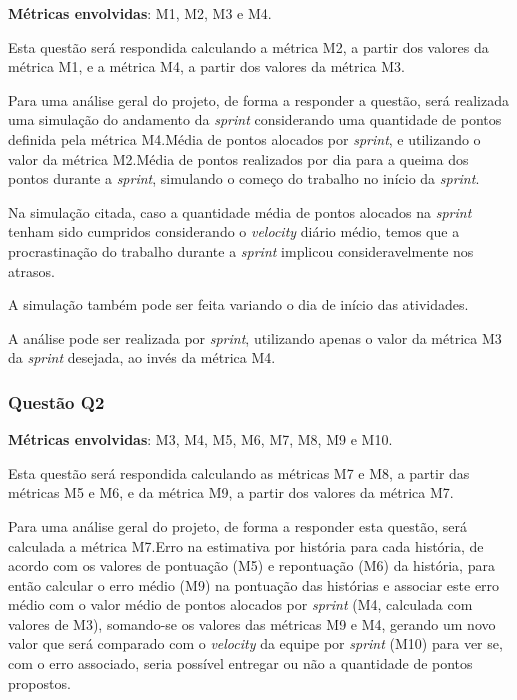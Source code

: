       		\textbf{Métricas envolvidas}: M1, M2, M3 e M4.

      		Esta questão será respondida calculando a métrica M2, a partir dos valores da métrica M1, e a métrica M4, a partir dos valores
      		da métrica M3.

      		Para uma análise geral do projeto, de forma a responder a questão, será realizada uma simulação do andamento da \textit{sprint} considerando uma quantidade de
      		pontos definida pela métrica M4.Média de pontos alocados por \textit{sprint}, e utilizando o valor da métrica M2.Média de pontos realizados por dia para a queima dos pontos durante a \textit{sprint}, simulando o começo do trabalho no início da \textit{sprint}.

      		Na simulação citada, caso a quantidade média de pontos alocados na \textit{sprint} tenham sido cumpridos considerando 
      		o \textit{velocity} diário médio, temos que a procrastinação do trabalho durante a \textit{sprint} implicou
      		consideravelmente nos atrasos.

      		A simulação também pode ser feita variando o dia de início das atividades.

      		A análise pode ser realizada por \textit{sprint}, utilizando apenas o valor da métrica M3 da \textit{sprint} desejada, ao invés da métrica M4.

  		\subsubsection{Questão Q2}

  			\textbf{Métricas envolvidas}: M3, M4, M5, M6, M7, M8, M9 e M10.
 
  			Esta questão será respondida calculando as métricas M7 e M8, a partir das métricas M5 e M6, e da métrica M9, a partir dos
  			valores da métrica M7.

  			Para uma análise geral do projeto, de forma a responder esta questão, será calculada a métrica M7.Erro na estimativa por história para cada história, de acordo com os valores
  			de pontuação (M5) e repontuação (M6) da história, para então calcular o erro médio (M9) na pontuação das histórias e associar
  			este erro médio com o valor médio de pontos alocados por \textit{sprint} (M4, calculada com valores de M3), somando-se os valores
  			das métricas M9 e M4, gerando um novo valor que será comparado com o \textit{velocity} da equipe por \textit{sprint} (M10) para ver se, com o erro associado, seria possível entregar ou não a quantidade de pontos propostos.

